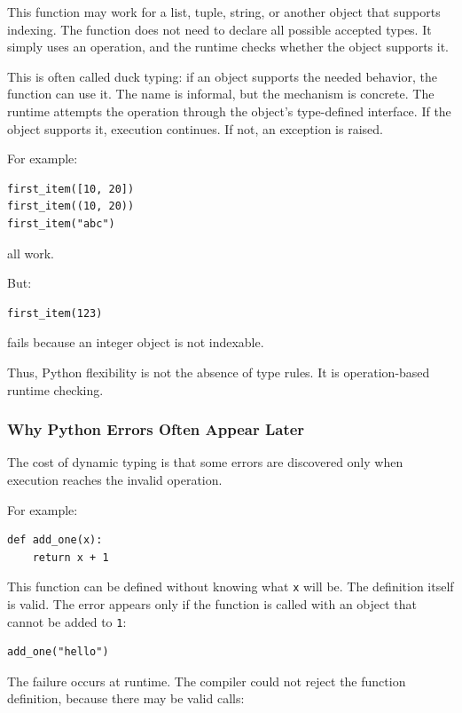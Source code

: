 This function may work for a list, tuple, string, or another object that supports indexing. The function does not need to declare all possible accepted types. It simply uses an operation, and the runtime checks whether the object supports it.

This is often called duck typing: if an object supports the needed behavior, the function can use it. The name is informal, but the mechanism is concrete. The runtime attempts the operation through the object's type-defined interface. If the object supports it, execution continues. If not, an exception is raised.

For example:

\begin{verbatim}
first_item([10, 20])
first_item((10, 20))
first_item("abc")
\end{verbatim}

all work.

But:

\begin{verbatim}
first_item(123)
\end{verbatim}

fails because an integer object is not indexable.

Thus, Python flexibility is not the absence of type rules. It is operation-based runtime checking.

\subsubsection*{Why Python Errors Often Appear Later}

The cost of dynamic typing is that some errors are discovered only when execution reaches the invalid operation.

For example:

\begin{verbatim}
def add_one(x):
    return x + 1
\end{verbatim}

This function can be defined without knowing what \texttt{x} will be. The definition itself is valid. The error appears only if the function is called with an object that cannot be added to \texttt{1}:

\begin{verbatim}
add_one("hello")
\end{verbatim}

The failure occurs at runtime. The compiler could not reject the function definition, because there may be valid calls:

